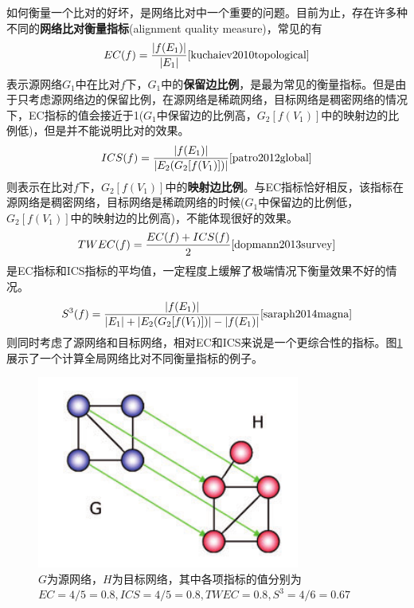 如何衡量一个比对的好坏，是网络比对中一个重要的问题。目前为止，存在许多种不同的\textbf{网络比对衡量指标}(alignment quality measure)，常见的有
\begin{equation*}
EC(f)=\frac{\left | f(E_1) \right |}{\left | E_1 \right |}\cite{kuchaiev2010topological}
\end{equation*}
表示源网络$G_1$中在比对$f$下，$G_1$中的\textbf{保留边比例}，是最为常见的衡量指标。但是由于只考虑源网络边的保留比例，在源网络是稀疏网络，目标网络是稠密网络的情况下，EC指标的值会接近于1($G_1$中保留边的比例高，$G_2[f(V_1)]$中的映射边的比例低)，但是并不能说明比对的效果。
\begin{equation*}
ICS(f)=\frac{\left | f(E_1) \right |}{\left |E_2(G_2[f(V_1)])\right |}\cite{patro2012global}
\end{equation*}
则表示在比对$f$下，$G_2[f(V_1)]$中的\textbf{映射边比例}。与EC指标恰好相反，该指标在源网络是稠密网络，目标网络是稀疏网络的时候($G_1$中保留边的比例低，$G_2[f(V_1)]$中的映射边的比例高)，不能体现很好的效果。
\begin{equation*}
TWEC(f)=\frac{EC(f)+ICS(f)}{2}\cite{dopmann2013survey}
\end{equation*}
是EC指标和ICS指标的平均值，一定程度上缓解了极端情况下衡量效果不好的情况。
\begin{equation*}
S^{3}(f)=\frac{\left | f(E_1) \right |}{\left | E_1 \right |+\left | E_2(G_2[f(V_1)]) \right |-\left | f(E_1) \right |}\cite{saraph2014magna}
\end{equation*}
则同时考虑了源网络和目标网络，相对EC和ICS来说是一个更综合性的指标。图\ref{fig:measure}展示了一个计算全局网络比对不同衡量指标的例子。

\begin{figure}[htbp]
\centering
\includegraphics[height=0.25\textheight]{pic/measure.png}
\caption{$G$为源网络，$H$为目标网络，其中各项指标的值分别为$EC=4/5=0.8,ICS=4/5=0.8,TWEC=0.8,S^3=4/6=0.67$ \cite{saraph2014magna} \label{fig:measure}}
\end{figure}

